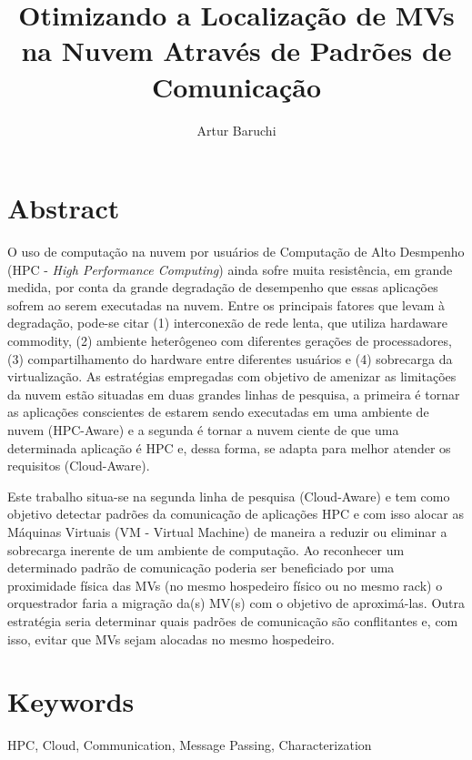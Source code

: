 \documentclass[11pt, titlepage]{article}
\begin{document}
\title{Otimizando a Localização de MVs na Nuvem Através de Padrões de Comunicação}\author{Artur Baruchi}
\maketitle
\section{Abstract}
\label{MPSection:916E337A-8E01-4963-AF49-BE8C7DC6C2A9}

O uso de computação na nuvem por usuários de Computação de Alto Desmpenho (HPC -
      \emph{High Performance Computing}) ainda sofre muita resistência, em grande medida, por conta da grande degradação de desempenho que essas aplicações sofrem ao serem executadas na nuvem. Entre os principais fatores que levam à degradação, pode-se citar (1) interconexão de rede lenta, que utiliza hardaware commodity, (2) ambiente heterôgeneo com diferentes gerações de processadores, (3) compartilhamento do hardware entre diferentes usuários e (4) sobrecarga da virtualização. As estratégias empregadas com objetivo de amenizar as limitações da nuvem estão situadas em duas grandes linhas de pesquisa, a primeira é tornar as aplicações conscientes de estarem sendo executadas em uma ambiente de nuvem (HPC-Aware) e a segunda é tornar a nuvem ciente de que uma determinada aplicação é HPC e, dessa forma, se adapta para melhor atender os requisitos (Cloud-Aware).

Este trabalho situa-se na segunda linha de pesquisa (Cloud-Aware) e tem como objetivo detectar padrões da comunicação de aplicações HPC e com isso alocar as Máquinas Virtuais (VM - Virtual Machine) de maneira a reduzir ou eliminar a sobrecarga inerente de um ambiente de computação. Ao reconhecer um determinado padrão de comunicação poderia ser beneficiado por uma proximidade física das MVs (no mesmo hospedeiro físico ou no mesmo rack) o orquestrador faria a migração da(s) MV(s) com o objetivo de aproximá-las. Outra estratégia seria determinar quais padrões de comunicação são conflitantes e, com isso, evitar que MVs sejam alocadas no mesmo hospedeiro.

\section{Keywords}
\label{MPSection:3D7588EF-0A74-4F02-AD69-655B1031BE95}

HPC, Cloud, Communication, Message Passing, Characterization
\end{document}
